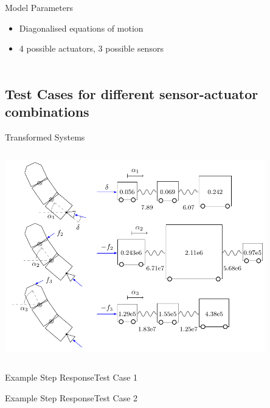 \documentclass{beamer}
\begin{document}
\begin{frame}{Model Parameters}
\begin{itemize}
\item Diagonalised equations of motion
\item 4 possible actuators, 3 possible sensors
\end{itemize}
\begin{multline}

\label{eq:num_rock1}
\end{multline}
\begin{equation}

\label{eq:num_rock2}
\end{equation}
\end{frame}

\subsection{Test Cases for different sensor-actuator combinations}

\begin{frame}{Transformed Systems}
\begin{columns}
\column{\textwidth}
    \includegraphics[width=0.85\textwidth]{graphics/rocket-trans-pres.pdf}
\end{columns}
\end{frame}

\begin{frame}{Example Step Response}{Test Case 1}
\begin{center}
    
\end{center}
\end{frame}

\begin{frame}{Example Step Response}{Test Case 2}
\begin{center}
    
\end{center}
\end{frame}
\end{document}
